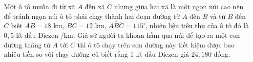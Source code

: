 \begin{bt}%
Một ô tô muốn đi từ xã $A$ đến xã $C$ nhưng giữa hai xã là một ngọn núi cao nên để tránh ngọn núi ô tô phải chạy thành hai đoạn đường từ $A$ đến $B$ và từ $B$ đến $C$ biết $AB=18$ km, $BC=12$ km, $\widehat{A B C}=115^{\circ}$, nhiên liệu tiêu thụ của ô tô đó là $0{,}5$ lít dầu Diezen /km. Giả sử người ta khoan hầm qua núi để tạo ra một con đường thẳng từ $A$ tới $C$ thì ô tô chạy trên con đường này tiết kiệm được bao nhiêu tiền so với chạy đường cũ biết rằng 1 lít dầu Diezen giá $24{,}180$ đồng.
\end{bt}

